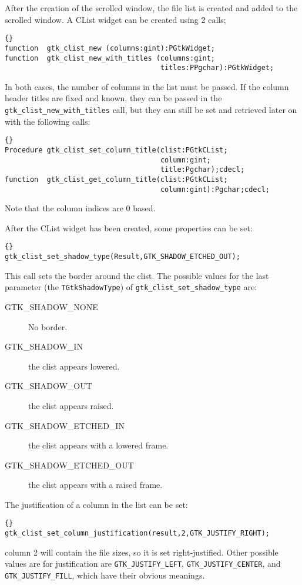 \documentclass[10pt]{article}
\begin{document}
After the creation of the scrolled window, the file list is created and
added to the scrolled window. A CList widget can be created using 2 calls;
\begin{lstlisting}{}
function  gtk_clist_new (columns:gint):PGtkWidget;
function  gtk_clist_new_with_titles (columns:gint;
                                     titles:PPgchar):PGtkWidget;
\end{lstlisting}
In both cases, the number of columns in the list must be passed. If
the column header titles are fixed and known, they can be passed in the
\lstinline|gtk_clist_new_with_titles| call, but they can still be set and
retrieved later on with the following calls:
\begin{lstlisting}{}
Procedure gtk_clist_set_column_title(clist:PGtkCList;
                                     column:gint;
                                     title:Pgchar);cdecl;
function  gtk_clist_get_column_title(clist:PGtkCList;
                                     column:gint):Pgchar;cdecl;
\end{lstlisting}
Note that the column indices are 0 based.

After the CList widget has been created, some properties can be set:
\begin{lstlisting}{}
gtk_clist_set_shadow_type(Result,GTK_SHADOW_ETCHED_OUT);
\end{lstlisting}
This call sets the border around the clist. The possible values for
the last parameter (the \lstinline|TGtkShadowType|) of 
\lstinline|gtk_clist_set_shadow_type| are:
\begin{description}
\item[GTK\_SHADOW\_NONE] No border.
\item[GTK\_SHADOW\_IN] the clist appears lowered.
\item[GTK\_SHADOW\_OUT] the clist appears raised.
\item[GTK\_SHADOW\_ETCHED\_IN] the clist appears with a lowered frame.
\item[GTK\_SHADOW\_ETCHED\_OUT] the clist appears with a raised frame.
\end{description}

The justification of a column in the list can be set:
\begin{lstlisting}{}
gtk_clist_set_column_justification(result,2,GTK_JUSTIFY_RIGHT);
\end{lstlisting}
column 2 will contain the file sizes, so it is set right-justified.
Other possible values are for justification are 
\lstinline|GTK_JUSTIFY_LEFT|, \lstinline|GTK_JUSTIFY_CENTER|, and 
\lstinline|GTK_JUSTIFY_FILL|, which have their obvious meanings.
\end{document}
